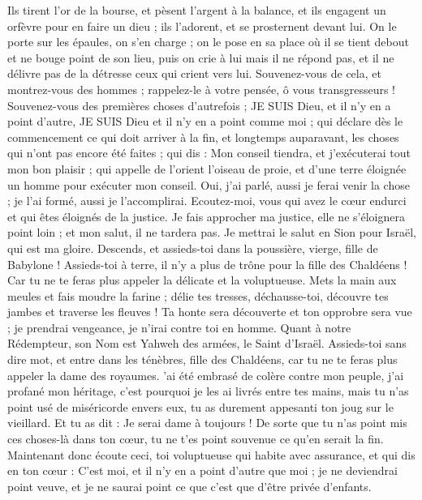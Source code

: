 \begin{multicols}{2}
Ils tirent l'or de la bourse, et pèsent l'argent à la balance, et ils engagent un orfèvre pour en faire un dieu ; ils l'adorent, et se prosternent devant lui.
On le porte sur les épaules, on s'en charge ; on le pose en sa place où il se tient debout et ne bouge point de son lieu, puis on crie à lui mais il ne répond pas, et il ne délivre pas de la détresse ceux qui crient vers lui.
Souvenez-vous de cela, et montrez-vous des hommes ; rappelez-le à votre pensée, ô vous transgresseurs !
Souvenez-vous des premières choses d'autrefois ; JE SUIS Dieu, et il n'y en a point d'autre, JE SUIS Dieu et il n'y en a point comme moi ;
qui déclare dès le commencement ce qui doit arriver à la fin, et longtemps auparavant, les choses qui n'ont pas encore été faites ; qui dis : Mon conseil tiendra, et j'exécuterai tout mon bon plaisir ;
qui appelle de l'orient l'oiseau de proie, et d'une terre éloignée un homme pour exécuter mon conseil. Oui, j'ai parlé, aussi je ferai venir la chose ; je l'ai formé, aussi je l'accomplirai. 
Ecoutez-moi, vous qui avez le cœur endurci et qui êtes éloignés de la justice.
Je fais approcher ma justice, elle ne s'éloignera point loin ; et mon salut, il ne tardera pas. Je mettrai le salut en Sion pour Israël, qui est ma gloire.
\VerseOne{}Descends, et assieds-toi dans la poussière, vierge, fille de Babylone ! Assieds-toi à terre, il n'y a plus de trône pour la fille des Chaldéens ! Car tu ne te feras plus appeler la délicate et la voluptueuse.
Mets la main aux meules et fais moudre la farine ; délie tes tresses, déchausse-toi, découvre tes jambes et traverse les fleuves !
Ta honte sera découverte et ton opprobre sera vue ; je prendrai vengeance, je n'irai contre toi en homme.
Quant à notre Rédempteur, son Nom est Yahweh des armées, le Saint d'Israël.
Assieds-toi sans dire mot, et entre dans les ténèbres, fille des Chaldéens, car tu ne te feras plus appeler la dame des royaumes.
'ai été embrasé de colère contre mon peuple, j'ai profané mon héritage, c'est pourquoi je les ai livrés entre tes mains, mais tu n'as point usé de miséricorde envers eux, tu as durement appesanti ton joug sur le vieillard.
Et tu as dit : Je serai dame à toujours ! De sorte que tu n'as point mis ces choses-là dans ton cœur, tu ne t'es point souvenue ce qu'en serait la fin.
Maintenant donc écoute ceci, toi voluptueuse qui habite avec assurance, et qui dis en ton cœur : C'est moi, et il n'y en a point d'autre que moi ; je ne deviendrai point veuve, et je ne saurai point ce que c'est que d'être privée d'enfants.

\end{multicols}
